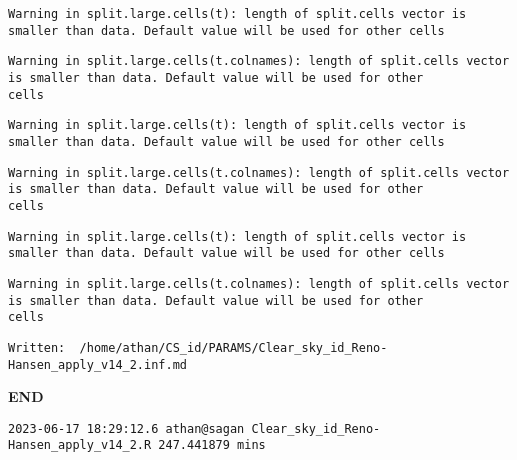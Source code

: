 \documentclass[
  10pt,
  a4paper,oneside]{article}
\begin{document}
\begin{verbatim}
Warning in split.large.cells(t): length of split.cells vector is smaller than data. Default value will be used for other cells
\end{verbatim}

\begin{verbatim}
Warning in split.large.cells(t.colnames): length of split.cells vector is smaller than data. Default value will be used for other
cells
\end{verbatim}

\begin{verbatim}
Warning in split.large.cells(t): length of split.cells vector is smaller than data. Default value will be used for other cells
\end{verbatim}

\begin{verbatim}
Warning in split.large.cells(t.colnames): length of split.cells vector is smaller than data. Default value will be used for other
cells
\end{verbatim}

\begin{verbatim}
Warning in split.large.cells(t): length of split.cells vector is smaller than data. Default value will be used for other cells
\end{verbatim}

\begin{verbatim}
Warning in split.large.cells(t.colnames): length of split.cells vector is smaller than data. Default value will be used for other
cells
\end{verbatim}

\begin{verbatim}
Written:  /home/athan/CS_id/PARAMS/Clear_sky_id_Reno-Hansen_apply_v14_2.inf.md 
\end{verbatim}

\textbf{END}

\begin{verbatim}
2023-06-17 18:29:12.6 athan@sagan Clear_sky_id_Reno-Hansen_apply_v14_2.R 247.441879 mins
\end{verbatim}
\end{document}
